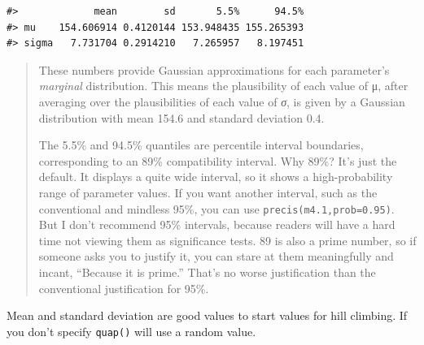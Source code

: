 \documentclass[
  letterpaper,
  DIV=11,
  numbers=noendperiod]{scrreprt}
\newenvironment{Shaded}{\begin{snugshade}}{\end{snugshade}}
\newcommand{\AttributeTok}[1]{\textcolor[rgb]{0.40,0.45,0.13}{#1}}
\newcommand{\CommentTok}[1]{\textcolor[rgb]{0.37,0.37,0.37}{#1}}
\newcommand{\DocumentationTok}[1]{\textcolor[rgb]{0.37,0.37,0.37}{\textit{#1}}}
\newcommand{\FloatTok}[1]{\textcolor[rgb]{0.68,0.00,0.00}{#1}}
\newcommand{\FunctionTok}[1]{\textcolor[rgb]{0.28,0.35,0.67}{#1}}
\newcommand{\InformationTok}[1]{\textcolor[rgb]{0.37,0.37,0.37}{#1}}
\newcommand{\NormalTok}[1]{\textcolor[rgb]{0.00,0.23,0.31}{#1}}
\newcommand{\OtherTok}[1]{\textcolor[rgb]{0.00,0.23,0.31}{#1}}
\newcommand{\SpecialCharTok}[1]{\textcolor[rgb]{0.37,0.37,0.37}{#1}}
\begin{document}
\begin{verbatim}
#>             mean        sd       5.5%      94.5%
#> mu    154.606914 0.4120144 153.948435 155.265393
#> sigma   7.731704 0.2914210   7.265957   8.197451
\end{verbatim}

\begin{quote}
These numbers provide Gaussian approximations for each parameter's
\emph{marginal} distribution. This means the plausibility of each value
of μ, after averaging over the plausibilities of each value of \emph{σ},
is given by a Gaussian distribution with mean 154.6 and standard
deviation 0.4.

The 5.5\% and 94.5\% quantiles are percentile interval boundaries,
corresponding to an 89\% compatibility interval. Why 89\%? It's just the
default. It displays a quite wide interval, so it shows a
high-probability range of parameter values. If you want another
interval, such as the conventional and mindless 95\%, you can use
\texttt{precis(m4.1,prob=0.95)}. But I don't recommend 95\% intervals,
because readers will have a hard time not viewing them as significance
tests. 89 is also a prime number, so if someone asks you to justify it,
you can stare at them meaningfully and incant, ``Because it is prime.''
That's no worse justification than the conventional justification for
95\%.
\end{quote}

Mean and standard deviation are good values to start values for hill
climbing. If you don't specify \texttt{quap()} will use a random value.

\begin{Shaded}
\end{Shaded}
\end{document}
